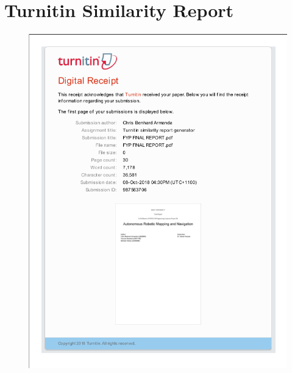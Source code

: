 \documentclass[12pt]{report}
\begin{document}
\chapter{Turnitin Similarity Report}
\begin{figure}[ht!]
    \centering
    \includegraphics[scale=0.55]{turnitinreport.png}
\end{figure}
\end{document}
